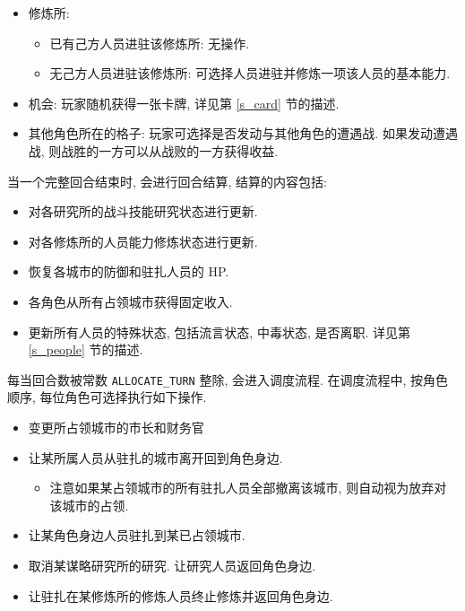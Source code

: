 \documentclass[UTF8, zihao=-4]{ctexart} %
\newcommand{\lcode}{\lstinline} % 段内插入代码
\begin{document}
\begin{itemize}
\begin{itemize}
\begin{itemize}
                \end{itemize}
            \item 修炼所:
                \begin{itemize}
                    \item 已有己方人员进驻该修炼所: 无操作.
                    \item 无己方人员进驻该修炼所: 可选择人员进驻并修炼一项该人员的基本能力.
                \end{itemize}
            \item 机会: 玩家随机获得一张卡牌, 详见第 \ref{s_card} 节的描述.
            \item 其他角色所在的格子: 玩家可选择是否发动与其他角色的遭遇战. 
                如果发动遭遇战, 则战胜的一方可以从战败的一方获得收益.
        \end{itemize}
\end{itemize}

当一个完整回合结束时, 会进行回合结算, 结算的内容包括:
\begin{itemize}
    \item 对各研究所的战斗技能研究状态进行更新.
    \item 对各修炼所的人员能力修炼状态进行更新.
    \item 恢复各城市的防御和驻扎人员的 HP.
    \item 各角色从所有占领城市获得固定收入.
    \item 更新所有人员的特殊状态, 包括流言状态, 中毒状态, 是否离职. 详见第 \ref{s_people} 节的描述.
\end{itemize}

每当回合数被常数 \lcode{ALLOCATE_TURN} 整除, 会进入调度流程. 在调度流程中, 按角色顺序, 每位角色可选择执行如下操作.
\begin{itemize}
    \item 变更所占领城市的市长和财务官
    \item 让某所属人员从驻扎的城市离开回到角色身边. 
        \begin{itemize}
            \item 注意如果某占领城市的所有驻扎人员全部撤离该城市, 则自动视为放弃对该城市的占领.
        \end{itemize}
    \item 让某角色身边人员驻扎到某已占领城市.
    \item 取消某谋略研究所的研究. 让研究人员返回角色身边.
    \item 让驻扎在某修炼所的修炼人员终止修炼并返回角色身边.
\end{itemize}
\end{document}
